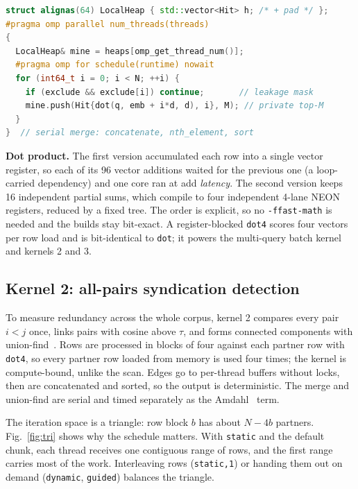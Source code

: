 \documentclass[conference,a4paper]{IEEEtran}
\begin{document}
\begin{lstlisting}[language=C++,caption={Core of kernel 1 (\texttt{engine/realfact\_engine.cpp}).},label={lst:kernel},float=t]
struct alignas(64) LocalHeap { std::vector<Hit> h; /* + pad */ };
#pragma omp parallel num_threads(threads)
{
  LocalHeap& mine = heaps[omp_get_thread_num()];
  #pragma omp for schedule(runtime) nowait
  for (int64_t i = 0; i < N; ++i) {
    if (exclude && exclude[i]) continue;       // leakage mask
    mine.push(Hit{dot(q, emb + i*d, d), i}, M); // private top-M
  }
}  // serial merge: concatenate, nth_element, sort
\end{lstlisting}

\textbf{Dot product.} The first version accumulated each row into a single vector register, so each of its 96 vector
additions waited for the previous one (a loop-carried dependency) and one core ran at add \emph{latency}. The second
version keeps 16 independent partial sums, which compile to four independent 4-lane NEON registers, reduced by a
fixed tree. The order is explicit, so no \texttt{-ffast-math} is needed and the builds stay bit-exact. A register-blocked
\texttt{dot4} scores four vectors per row load and is bit-identical to \texttt{dot}; it powers the multi-query batch
kernel and kernels 2 and 3.

\subsection{Kernel 2: all-pairs syndication detection}
To measure redundancy across the whole corpus, kernel 2 compares every pair $i<j$ once, links pairs with cosine
above $\tau$, and forms connected components with union-find~\cite{tarjan}. Rows are processed in blocks of four
against each partner row with \texttt{dot4}, so every partner row loaded from memory is used four times; the kernel
is compute-bound, unlike the scan. Edges go to per-thread buffers without locks, then are concatenated and sorted, so
the output is deterministic. The merge and union-find are serial and timed separately as the Amdahl~\cite{amdahl} term.

The iteration space is a triangle: row block $b$ has about $N-4b$ partners. Fig.~\ref{fig:tri} shows why the schedule
matters. With \texttt{static} and the default chunk, each thread receives one contiguous range of rows, and the first
range carries most of the work. Interleaving rows (\texttt{static,1}) or handing them out on demand
(\texttt{dynamic}, \texttt{guided}) balances the triangle.
\end{document}
